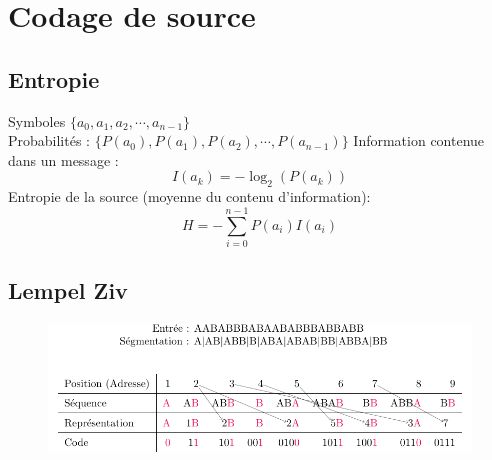 \documentclass[resume]{subfiles}
\begin{document}
\section{Codage de source}
\subsection{Entropie}
Symboles $\lbrace a_0, a_1, a_2, \cdots, a_{n-1}\rbrace$\\
Probabilités : $\lbrace P(a_0), P(a_1), P(a_2), \cdots, P(a_{n-1})\rbrace$
Information contenue dans un message :
$$I(a_k)=-\log_2(P(a_k))$$
Entropie de la source (moyenne du contenu d'information):
$$H=-\sum_{i=0}^{n-1}P(a_i)I(a_i)$$
\subsection{Lempel Ziv}
\begin{figure}[H]
\centering
\includegraphics[width=\columnwidth]{drwg_0.pdf}
\end{figure}
\end{document}
